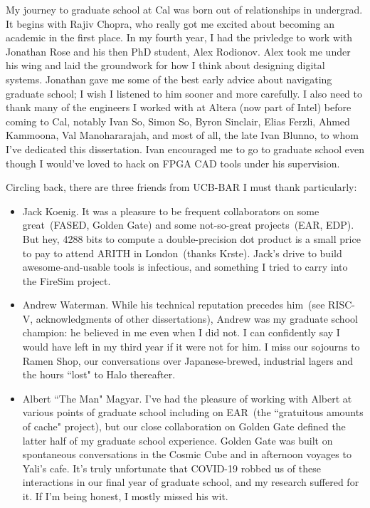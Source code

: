 My journey to graduate school at Cal was born out of relationships in
undergrad. It begins with Rajiv Chopra, who really got me excited about
becoming an academic in the first place. In my fourth year, I had the privledge
to work with Jonathan Rose and his then PhD student, Alex Rodionov. Alex took me
under his wing and laid the groundwork for how I think about designing digital
systems. Jonathan gave me some of the best early advice about navigating
graduate school; I wish I listened to him sooner and more carefully. I also need to thank
many of the engineers I worked with at Altera (now part of Intel) before coming to Cal, notably
Ivan So, Simon So, Byron Sinclair, Elias Ferzli, Ahmed Kammoona, Val
Manohararajah, and most of all, the late Ivan Blunno, to whom I've dedicated
this dissertation. Ivan encouraged me to go to graduate school even though I would've
loved to hack on FPGA CAD tools under his supervision.

Circling back, there are three friends from UCB-BAR I must thank particularly:
\begin{itemize}
\item Jack Koenig. It was a pleasure to be frequent collaborators on some
great~(FASED, Golden Gate) and some not-so-great projects~(EAR, EDP). But hey,
4288 bits to compute a double-precision dot product is a small price to pay to
attend ARITH in London~(thanks Krste). Jack's drive to build awesome-and-usable
tools is infectious, and something I tried to carry into the FireSim project.

\item Andrew Waterman. While his
technical reputation precedes him~(see RISC-V, acknowledgments of other
dissertations), Andrew was my graduate school champion: he believed in me even when I did not.
I can confidently say I would have left in my
third year if it were not for him. I miss our sojourns to Ramen Shop,
our conversations over Japanese-brewed, industrial lagers and the hours
``lost" to Halo thereafter.

\item Albert ``The Man" Magyar. I've had the pleasure of working with Albert at
various points of graduate school including on EAR~(the ``gratuitous
amounts of cache" project), but our close collaboration on Golden Gate
defined the latter half of my graduate school experience. Golden Gate
was built on spontaneous conversations in the Cosmic Cube and in afternoon
voyages to Yali's cafe. It's truly unfortunate that COVID-19 robbed us of these interactions in our
final year of graduate school, and my research suffered for it. If I'm
being honest, I mostly missed his wit.
\end{itemize}

